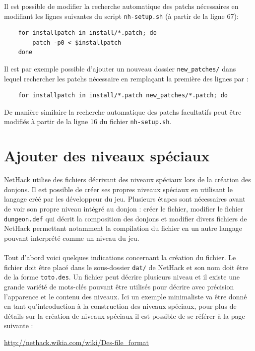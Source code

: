 \documentclass[10pt,a4paper]{report}
\begin{document}
Il est possible de modifier la recherche automatique des patchs nécessaires en
modifiant les lignes suivantes du script \verb!nh-setup.sh! (à partir de la
ligne 67):
\begin{verbatim}
    for installpatch in install/*.patch; do
        patch -p0 < $installpatch
    done
\end{verbatim}

Il est par exemple possible d'ajouter un nouveau dossier \verb!new_patches/!
dans lequel rechercher les patchs nécessaire en remplaçant la première des
lignes par :
\begin{verbatim}
    for installpatch in install/*.patch new_patches/*.patch; do
\end{verbatim}

De manière similaire la recherche automatique des patchs facultatifs peut être
modifiés à partir de la ligne 16 du fichier \verb!nh-setup.sh!.

\section{Ajouter des niveaux spéciaux}

NetHack utilise des fichiers décrivant des niveaux spéciaux lors de la
création des donjons. Il est possible de créer ses propres niveaux spéciaux en
utilisant le langage créé par les développeur du jeu. Plusieurs étapes sont
nécessaires avant de voir son propre niveau intégré au donjon : créer le
fichier, modifier le fichier \verb!dungeon.def! qui décrit la composition des
donjons et modifier divers fichiers de NetHack permettant notamment la
compilation du fichier en un autre langage pouvant interprété comme un niveau
du jeu.

\paragraph{}
Tout d'abord voici quelques indications concernant la création du fichier. Le
fichier doit être placé dans le sous-dossier \verb!dat/! de NetHack et son nom
doit être de la forme \verb!toto.des!. Un fichier peut décrire plusieurs
niveau et il existe une grande variété de mots-clés pouvant être utilisés pour
décrire avec précision l'apparence et le contenu des niveaux. Ici un exemple
minimaliste va être donné en tant qu'introduction à la construction des
niveaux spéciaux, pour plus de détails sur la création de niveaux spéciaux il
est possible de se référer à la page suivante :

\url{http://nethack.wikia.com/wiki/Des-file\_format}
\end{document}

